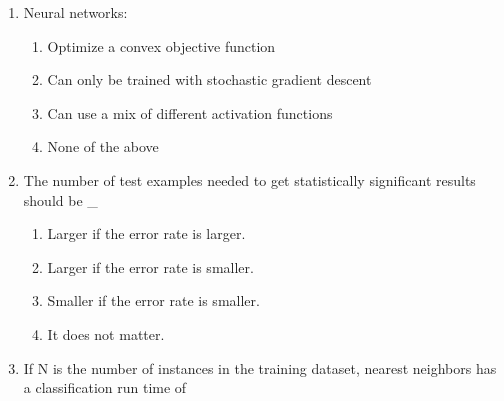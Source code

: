 \documentclass[{\csname fa0013Font0\endcsname\char"0033}{\csname fa0014Font0\endcsname\char"0034}pt]{article}
\begin{document}
\begin{enumerate}[label=\arabic*.]
\begin{enumerate}[label=(\alph*)]
    \item {\csname fa0017Font0\endcsname\char"0065}{\csname fa0017Font1\endcsname\char"0076}{\csname fa0017Font2\endcsname\char"0065}{\csname fa0017Font3\endcsname\char"006E}{\csname fa0017Font4\endcsname\char"0074} detection
    \item {\csname fa0018Font0\endcsname\char"0062}{\csname fa0018Font1\endcsname\char"0069}{\csname fa0018Font2\endcsname\char"006E}{\char"0061}{\csname fa0018Font4\endcsname\char"0072}{\csname fa0018Font5\endcsname\char"0079} detection
    \item train-test mismatch {\csname fa0019Font0\endcsname\char"0066}{\csname fa0019Font1\endcsname\char"0072}{\csname fa0019Font2\endcsname\char"0061}{\csname fa0019Font3\endcsname\char"0067}{\csname fa0019Font4\endcsname\char"0069}{\csname fa0019Font5\endcsname\char"006C}{\csname fa0019Font6\endcsname\char"0069}{\csname fa0019Font7\endcsname\char"0074}{\csname fa0019Font8\endcsname\char"0079}
    \item {\csname fa0020Font0\endcsname\char"006E}{\csname fa0020Font1\endcsname\char"006F}{\csname fa0020Font2\endcsname\char"0069}{\csname fa0020Font3\endcsname\char"0073}{\csname fa0020Font4\endcsname\char"0065} detection
\end{enumerate}
\item Neural networks:
\begin{enumerate}[label=(\alph*)]
    \item Optimize a convex objective function
    \item Can only be trained with stochastic gradient descent
    \item Can use a mix of different activation functions
    \item None of the above
\end{enumerate}
\item The number of test examples needed to get statistically significant results should be \_
\begin{enumerate}[label=(\alph*)]
    \item Larger if the error rate is larger.
    \item Larger if the error rate is smaller.
    \item Smaller if the error rate is smaller.
    \item It does not matter.
\end{enumerate}
\item If N is the number of instances in the training dataset, nearest neighbors has a classification run time of

\end{enumerate}
\end{document}
